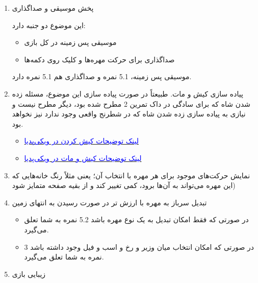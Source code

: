 \documentclass[]{article}
\begin{document}
\begin{itemize}[label = {$\blacksquare$}]
\begin{enumerate}
\item
پخش موسیقی و صداگذاری

این موضوع دو جنبه دارد:
\begin{itemize}[label = $\Leftarrow$]

\item
موسیقی پس زمینه در کل بازی


\item
صداگذاری برای حرکت مهره‌ها و کلیک روی دکمه‌ها


\end{itemize}

 موسیقی پس زمینه، 5.1 نمره و صداگذاری هم 5.1 نمره دارد.
 

\newpage
\item
پیاده سازی کیش و مات. طبیعتاً در صورت پیاده سازی این موضوع، مسئله زده شدن شاه که برای سادگی در داک تمرین 2 مطرح شده بود، دیگر مطرح نیست و نیازی به پیاده سازی زده شدن شاه که در شطرنج واقعی وجود ندارد نیز نخواهد بود.

\begin{itemize}[label = $\Leftarrow$]

\item
\href{https://en.wikipedia.org/wiki/Check_(chess)}{\textcolor{blue}{لینک توضیحات کیش کردن در ویکی‌پدیا}}

\item
\href{https://en.wikipedia.org/wiki/Checkmate}{\textcolor{blue}{لینک توضیحات کیش و مات در ویکی‌پدیا}}


\end{itemize}

\item
نمایش حرکت‌های موجود برای هر مهره با انتخاب آن؛ یعنی مثلاً رنگ خانه‌هایی که این مهره می‌تواند به آن‌ها برود، کمی تغییر کند و از بقیه صفحه متمایز شود)

\item
تبدیل سرباز به مهره با ارزش تر در صورت رسیدن به انتهای زمین

\begin{itemize}[label = $\Leftarrow$]

\item
در صورتی که فقط امکان تبدیل به یک نوع مهره باشد 5.2 نمره به شما تعلق می‌گیرد.



\item
در صورتی که امکان انتخاب میان وزیر و رخ و اسب و فیل وجود داشته باشد 3 نمره به شما تعلق می‌گیرد.

\end{itemize}

\item
زیبایی بازی




\end{enumerate}

\setcounter{secnumdepth}{6}

\end{itemize}
\end{document}
